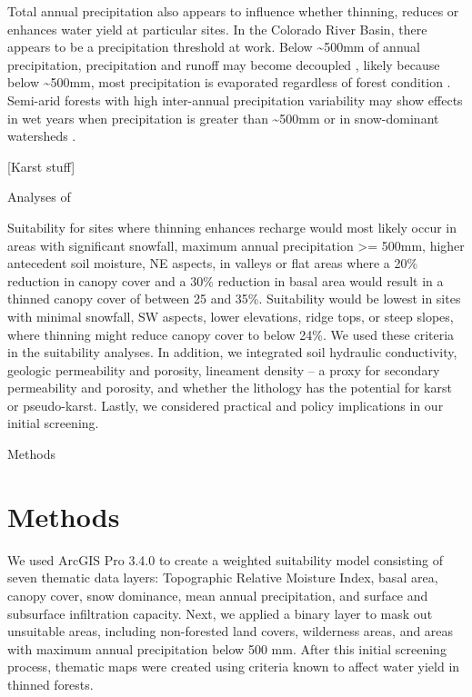 \documentclass[
  number,
  preprint,
  3p,
  onecolumn]{elsarticle}
\begin{document}
Total annual precipitation also appears to influence whether thinning,
reduces or enhances water yield at particular sites. In the Colorado
River Basin, there appears to be a precipitation threshold at work.
Below \textasciitilde500mm of annual precipitation, precipitation and
runoff may become decoupled \citep{biederman2022}, likely because below
\textasciitilde500mm, most precipitation is evaporated regardless of
forest condition . Semi-arid forests with high inter-annual
precipitation variability may show effects in wet years when
precipitation is greater than \textasciitilde500mm or in snow-dominant
watersheds \citep{adams2012}.

{[}Karst stuff{]}

Analyses of

Suitability for sites where thinning enhances recharge would most likely
occur in areas with significant snowfall, maximum annual precipitation
\textgreater= 500mm, higher antecedent soil moisture, NE aspects, in
valleys or flat areas where a 20\% reduction in canopy cover and a 30\%
reduction in basal area would result in a thinned canopy cover of
between 25 and 35\%. Suitability would be lowest in sites with minimal
snowfall, SW aspects, lower elevations, ridge tops, or steep slopes,
where thinning might reduce canopy cover to below 24\%. We used these
criteria in the suitability analyses. In addition, we integrated soil
hydraulic conductivity, geologic permeability and porosity, lineament
density -- a proxy for secondary permeability and porosity, and whether
the lithology has the potential for karst or pseudo-karst. Lastly, we
considered practical and policy implications in our initial screening.

Methods

\section{Methods}\label{methods}

We used ArcGIS Pro 3.4.0 to create a weighted suitability model
consisting of seven thematic data layers: Topographic Relative Moisture
Index, basal area, canopy cover, snow dominance, mean annual
precipitation, and surface and subsurface infiltration capacity. Next,
we applied a binary layer to mask out unsuitable areas, including
non-forested land covers, wilderness areas, and areas with maximum
annual precipitation below 500 mm. After this initial screening process,
thematic maps were created using criteria known to affect water yield in
thinned forests.
\end{document}

